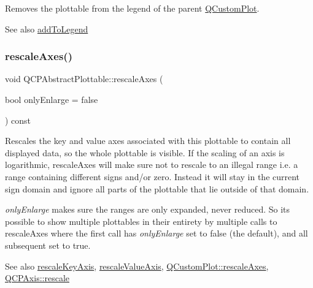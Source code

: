 Removes the plottable from the legend of the parent \mbox{\hyperlink{class_q_custom_plot}{Q\+Custom\+Plot}}.

\begin{DoxySeeAlso}{See also}
\mbox{\hyperlink{class_q_c_p_abstract_plottable_aa64e93cb5b606d8110d2cc0a349bb30f}{add\+To\+Legend}} 
\end{DoxySeeAlso}
\mbox{\label{class_q_c_p_abstract_plottable_a1491c4a606bccd2d09e65e11b79eb882}} 
\subsubsection{\texorpdfstring{rescale\+Axes()}{rescaleAxes()}}
{\footnotesize\ttfamily void Q\+C\+P\+Abstract\+Plottable\+::rescale\+Axes (\begin{DoxyParamCaption}\item[{bool}]{only\+Enlarge = {\ttfamily false} }\end{DoxyParamCaption}) const}

Rescales the key and value axes associated with this plottable to contain all displayed data, so the whole plottable is visible. If the scaling of an axis is logarithmic, rescale\+Axes will make sure not to rescale to an illegal range i.\+e. a range containing different signs and/or zero. Instead it will stay in the current sign domain and ignore all parts of the plottable that lie outside of that domain.

{\itshape only\+Enlarge} makes sure the ranges are only expanded, never reduced. So it\textquotesingle{}s possible to show multiple plottables in their entirety by multiple calls to rescale\+Axes where the first call has {\itshape only\+Enlarge} set to false (the default), and all subsequent set to true.

\begin{DoxySeeAlso}{See also}
\mbox{\hyperlink{class_q_c_p_abstract_plottable_ae96b83c961e257da116c6acf9c7da308}{rescale\+Key\+Axis}}, \mbox{\hyperlink{class_q_c_p_abstract_plottable_a714eaf36b12434cd71846215504db82e}{rescale\+Value\+Axis}}, \mbox{\hyperlink{class_q_custom_plot_ad86528f2cee6c7e446dea4a6e8839935}{Q\+Custom\+Plot\+::rescale\+Axes}}, \mbox{\hyperlink{class_q_c_p_axis_a499345f02ebce4b23d8ccec96e58daa9}{Q\+C\+P\+Axis\+::rescale}} 
\end{DoxySeeAlso}
\mbox{\label{class_q_c_p_abstract_plottable_ae96b83c961e257da116c6acf9c7da308}} 
